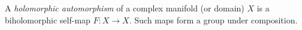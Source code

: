 
A \emph{holomorphic automorphism} of a complex manifold (or domain) $X$ is a biholomorphic self-map $F:X\to X$. Such maps form a group under composition.
